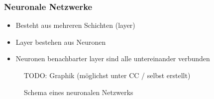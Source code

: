 \begin{frame}
    \frametitle{Neuronale Netzwerke}
    \begin{itemize}
        \item Besteht aus mehreren Schichten (layer)
        \item Layer bestehen aus Neuronen
        \item Neuronen benachbarter layer sind alle untereinander verbunden
    \end{itemize}
    \begin{figure}
        TODO: Graphik (möglichst unter CC / selbst erstellt)
        \caption{Schema eines neuronalen Netzwerks}
    \end{figure}
\end{frame}
